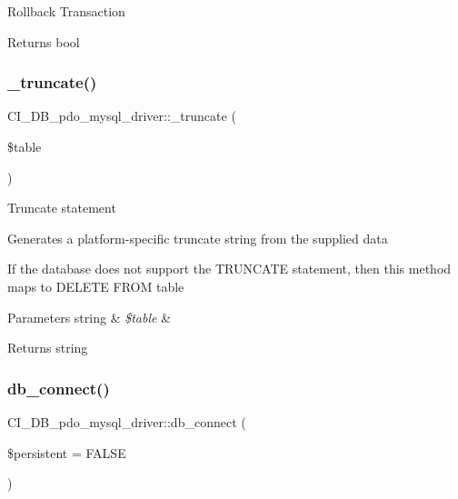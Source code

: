 Rollback Transaction

\begin{DoxyReturn}{Returns}
bool 
\end{DoxyReturn}
\mbox{\label{class_c_i___d_b__pdo__mysql__driver_a6549334c535d1a3fe1b74348da30c7cf}} 
\subsubsection{\texorpdfstring{\+\_\+truncate()}{\_truncate()}}
{\footnotesize\ttfamily C\+I\+\_\+\+D\+B\+\_\+pdo\+\_\+mysql\+\_\+driver\+::\+\_\+truncate (\begin{DoxyParamCaption}\item[{}]{\$table }\end{DoxyParamCaption})\hspace{0.3cm}{\ttfamily [protected]}}

Truncate statement

Generates a platform-\/specific truncate string from the supplied data

If the database does not support the T\+R\+U\+N\+C\+A\+TE statement, then this method maps to \textquotesingle{}D\+E\+L\+E\+TE F\+R\+OM table\textquotesingle{}


\begin{DoxyParams}[1]{Parameters}
string & {\em \$table} & \\
\hline
\end{DoxyParams}
\begin{DoxyReturn}{Returns}
string 
\end{DoxyReturn}
\mbox{\label{class_c_i___d_b__pdo__mysql__driver_a284f0abbd06ce4b99c5d48fa418e4a1b}} 
\subsubsection{\texorpdfstring{db\+\_\+connect()}{db\_connect()}}
{\footnotesize\ttfamily C\+I\+\_\+\+D\+B\+\_\+pdo\+\_\+mysql\+\_\+driver\+::db\+\_\+connect (\begin{DoxyParamCaption}\item[{}]{\$persistent = {\ttfamily FALSE} }\end{DoxyParamCaption})}

